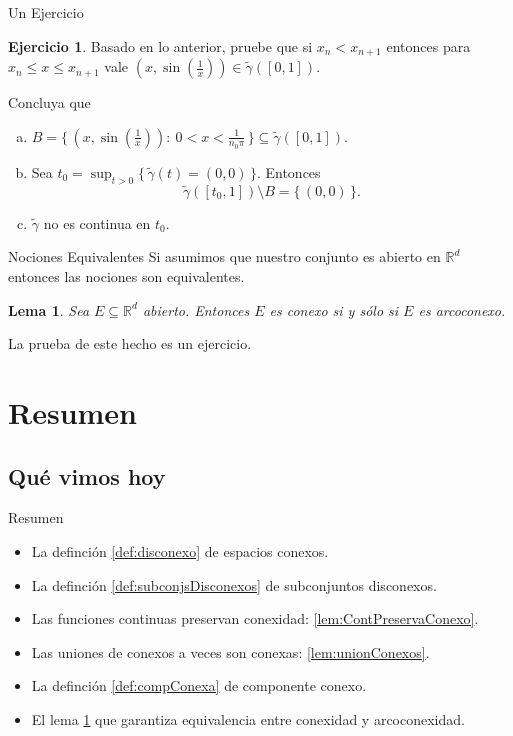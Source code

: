 \documentclass[utf8]{beamer}
\theoremstyle{plain}
\newtheorem{Lem}{Lema}                 %
\theoremstyle{definition}
\newtheorem{Ej}{Ejercicio}             %
\theoremstyle{remark}
\numberwithin{equation}{section}
\newcommand{\ga}{\gamma}                %
\newcommand{\bR}{\mathbb{R}}    %
\newcommand{\set}[1]{\{\,#1\,\}}    %
\newcommand{\Set}[1]{\biggl\{\,#1\,\biggr\}} %
\renewcommand{\leq}{\leqslant}          %
\newcommand{\less}{\setminus}           %
\renewcommand{\.}{\Cdot}                %
\begin{document}
\begin{frame}{Un Ejercicio}
  \begin{Ej}\label{ej:detalleArcoconexidad}
    Basado en lo anterior, pruebe que si $x_n<x_{n+1}$ entonces para $x_n\leq x\leq x_{n+1}$ vale $\left(x,\sin\left(\frac{1}{x}\right)\right)\in\tilde{\ga}([0,1])$.\par 
    Concluya que 
    \begin{enumerate}[a)]
      \item $B=\Set{\left(x,\sin\left(\frac{1}{x}\right)\right):\ 0<x<\frac{1}{n_0\pi}}\subseteq \tilde{\ga}([0,1])$.
      \item Sea $t_0=\sup_{t>0}\set{\tilde{\ga}(t)=(0,0)}$. Entonces 
      $$\tilde{\ga}([t_0,1])\less B=\set{(0,0)}.$$
      \item $\tilde{\ga}$ no es continua en $t_0$.
    \end{enumerate}
  \end{Ej}
\end{frame}

\begin{frame}{Nociones Equivalentes}
  Si asumimos que nuestro conjunto es abierto en $\bR^d$ entonces las nociones son equivalentes.
  \begin{Lem}\label{lem:EnRdConexoIffArcoconexo}
    Sea $E\subseteq\bR^d$ abierto. Entonces $E$ es conexo si y sólo si $E$ es arcoconexo.
  \end{Lem}

  La prueba de este hecho es un \alert{ejercicio}.
\end{frame}
\section*{Resumen}

\subsection*{Qu\'e vimos hoy}

\begin{frame}{Resumen}

  \begin{itemize}
  \item La definción \ref{def:disconexo} de espacios conexos.
  \item La definción \ref{def:subconjsDisconexos} de subconjuntos disconexos.
  \item Las funciones continuas preservan conexidad: \ref{lem:ContPreservaConexo}.
  \item Las uniones de conexos a veces son conexas: \ref{lem:unionConexos}.
  \item La definción \ref{def:compConexa} de componente conexo.
  \item El lema \ref{lem:EnRdConexoIffArcoconexo} que garantiza equivalencia entre conexidad y arcoconexidad.
  \end{itemize}
  
\end{frame}
\end{document}
